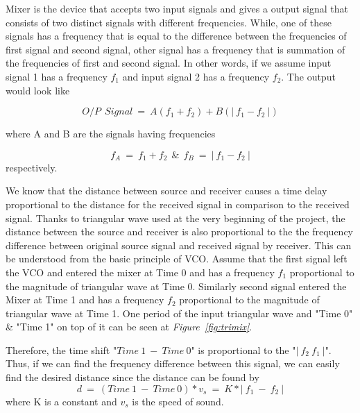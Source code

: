 \documentclass[paper]{IEEEtran}
\begin{document}
	Mixer is the device that accepts two input signals and gives a output signal that consists of two distinct signals with different frequencies. While, one of these signals has a frequency that is equal to the difference between the frequencies of first signal and second signal, other signal has a frequency that is summation of the frequencies of first and second signal. In other words, if we assume input signal 1 has a frequency $f_1$ and input signal 2 has a frequency $f_2$. The output would look like  
	
	$$ O/P~~ Signal ~=~ A(f_1+f_2) + B(|~f_1 -f_2~|)  $$
	
	where A and B are the signals having frequencies  
	
	$$ f_A ~= ~ f_1+f_2~~ \&~~ f_B~=~|~f_1 -f_2~| $$ respectively.
	
	We know that the distance between source and receiver causes a time delay proportional to the distance for the received signal in comparison to the received signal. Thanks to triangular wave used at the very beginning of the project, the distance between the source and receiver is also proportional to the the frequency difference between original source signal and received signal by receiver. This can be understood from the basic principle of VCO. Assume that the first signal left the VCO and entered the mixer at Time 0 and has a frequency $f_1$ proportional to the magnitude of triangular wave at Time 0. Similarly second signal entered the Mixer at Time 1 and has a frequency $f_2$ proportional to the magnitude of triangular wave at Time 1. One period of the input triangular wave and "Time 0" \& "Time 1" on top of it can be seen at \textit{Figure~\ref{fig:trimix}}. 
	
	Therefore, the time shift "$Time~1~-~Time~0$" is proportional to the "$|~f_2~f_1~|$". Thus, if we can find the frequency difference between this signal, we can easily find the desired distance since the distance can be found by
	$$ d~=~(Time~1~-~Time~0)*v_s~=~K*|~f_1~-~f_2~|$$ 
	where K is a constant and $v_s$ is the speed of sound.
	
\end{document}
